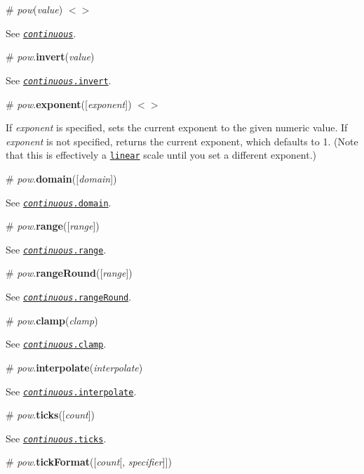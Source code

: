 \label{_pow}%
\# {\itshape pow}({\itshape value}) \href{https://github.com/d3/d3-scale/blob/master/src/pow.js#L9}{\tt $<$$>$}

See \href{#_continuous}{\tt {\itshape continuous}}.

\label{_pow_invert}%
\# {\itshape pow}.{\bfseries invert}({\itshape value})

See \href{#continuous_invert}{\tt {\itshape continuous}.invert}.

\label{_pow_exponent}%
\# {\itshape pow}.{\bfseries exponent}(\mbox{[}{\itshape exponent}\mbox{]}) \href{https://github.com/d3/d3-scale/blob/master/src/pow.js#L25}{\tt $<$$>$}

If {\itshape exponent} is specified, sets the current exponent to the given numeric value. If {\itshape exponent} is not specified, returns the current exponent, which defaults to 1. (Note that this is effectively a \href{#linear-scales}{\tt linear} scale until you set a different exponent.)

\label{_pow_domain}%
\# {\itshape pow}.{\bfseries domain}(\mbox{[}{\itshape domain}\mbox{]})

See \href{#continuous_domain}{\tt {\itshape continuous}.domain}.

\label{_pow_range}%
\# {\itshape pow}.{\bfseries range}(\mbox{[}{\itshape range}\mbox{]})

See \href{#continuous_range}{\tt {\itshape continuous}.range}.

\label{_pow_rangeRound}%
\# {\itshape pow}.{\bfseries range\+Round}(\mbox{[}{\itshape range}\mbox{]})

See \href{#continuous_rangeRound}{\tt {\itshape continuous}.range\+Round}.

\label{_pow_clamp}%
\# {\itshape pow}.{\bfseries clamp}({\itshape clamp})

See \href{#continuous_clamp}{\tt {\itshape continuous}.clamp}.

\label{_pow_interpolate}%
\# {\itshape pow}.{\bfseries interpolate}({\itshape interpolate})

See \href{#continuous_interpolate}{\tt {\itshape continuous}.interpolate}.

\label{_pow_ticks}%
\# {\itshape pow}.{\bfseries ticks}(\mbox{[}{\itshape count}\mbox{]})

See \href{#continuous_ticks}{\tt {\itshape continuous}.ticks}.

\label{_pow_tickFormat}%
\# {\itshape pow}.{\bfseries tick\+Format}(\mbox{[}{\itshape count}\mbox{[}, {\itshape specifier}\mbox{]}\mbox{]})

